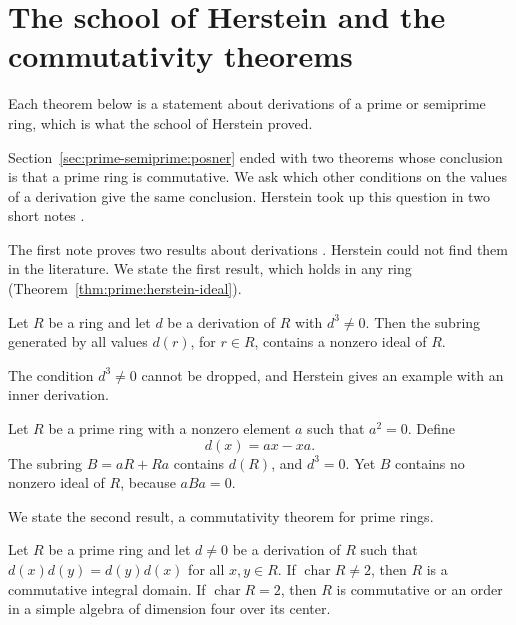 \section{The school of Herstein and the commutativity theorems}\label{sec:prime-semiprime:herstein-school}

Each theorem below is a statement about derivations of a prime or semiprime ring, which is what the school of Herstein proved.

Section~\ref{sec:prime-semiprime:posner} ended with two theorems whose
conclusion is that a prime ring is commutative. We ask which other conditions
on the values of a derivation give the same conclusion. Herstein took up this
question in two short notes \cite{Herstein1978,Herstein1979}.

The first note proves two results about derivations \cite[p.~369]{Herstein1978}. Herstein could not find them in the literature. We state the first result, which holds in any ring (Theorem~\ref{thm:prime:herstein-ideal}).

\begin{theorem}\label{thm:prime:herstein-ideal}
Let $R$ be a ring and let $d$ be a derivation of $R$ with $d^3\neq 0$. Then the
subring generated by all values $d(r)$, for $r\in R$, contains a nonzero ideal
of $R$.
\end{theorem}

The condition $d^3\neq 0$ cannot be dropped, and Herstein gives an example with
an inner derivation.

\begin{example}\label{ex:prime:herstein-cube}
Let $R$ be a prime ring with a nonzero element $a$ such that $a^2=0$. Define
\[
d(x)=ax-xa .
\]
The subring $B=aR+Ra$ contains $d(R)$, and $d^3=0$. Yet $B$ contains no nonzero
ideal of $R$, because $aBa=0$.
\end{example}

We state the second result, a commutativity theorem for prime rings.

\begin{theorem}\label{thm:prime:herstein-commuting}
Let $R$ be a prime ring and let $d\neq 0$ be a derivation of $R$ such that
$d(x)d(y)=d(y)d(x)$ for all $x,y\in R$. If $\operatorname{char}R\neq 2$, then
$R$ is a commutative integral domain. If $\operatorname{char}R=2$, then $R$ is
commutative or an order in a simple algebra of dimension four over its center.
\end{theorem}

